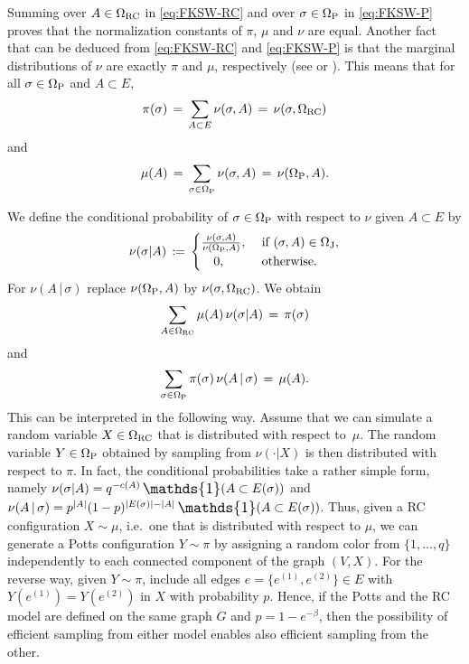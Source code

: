 \documentclass{dis}
\theoremstyle{citing}
\begin{document}
Summing over $A\in {\Omega}_{\rm RC}$ in \eqref{eq:FKSW-RC} and over 
$\sigma\in{\Omega}_{\rm P}$ in \eqref{eq:FKSW-P} 
proves that the normalization constants of $\pi$, $\mu$ and 
$\nu$ are equal.
Another fact that can be deduced from \eqref{eq:FKSW-RC} and 
\eqref{eq:FKSW-P} is that the marginal distributions of 
$\nu$ are exactly $\pi$ and $\mu$, respectively 
(see \cite{ES} or \cite{G1}).
This means that for all $\sigma\in{\Omega}_{\rm P}$ and 
$A\subset E$, 
\[
\pi(\sigma) \,=\, \sum_{A\subset E} \nu(\sigma,A) 
\,=\, \nu(\sigma,{\Omega}_{\rm RC})
\]
and 
\[
\mu(A) \,=\, \sum_{\sigma\in{\Omega}_{\rm P}} \nu(\sigma,A) 
\,=\, \nu({\Omega}_{\rm P},A).
\]

We define the conditional probability of $\sigma\in{\Omega}_{\rm P}$ 
with respect to $\nu$ given $A\subset E$ by
\begin{equation} \label{eq:joint-cond}
\nu(\sigma | A) \,:=\, \begin{cases}
\frac{\nu(\sigma,A)}{\nu({\Omega}_{\rm P},A)}, 
	&\text{ if } (\sigma,A)\in{\Omega}_{\rm J}, \\
\quad 0,& \text{ otherwise.}
\end{cases}
\end{equation}
For $\nu(A \,|\, \sigma)$ replace $\nu({{\Omega}_{\rm P}},A)$ by 
$\nu(\sigma,{{\Omega}_{\rm RC}})$. 
We obtain 
\[
\sum_{A\in{\Omega}_{\rm RC}} \mu(A)\, \nu(\sigma | A) 
\,=\, \pi(\sigma)
\]
and
\[
\sum_{\sigma\in{\Omega}_{\rm P}} \pi(\sigma)\, \nu(A \,|\, \sigma) 
\,=\, \mu(A).
\]
This can be interpreted in the following way.
Assume that we can simulate a random variable $X\in{\Omega}_{\rm RC}$ that is 
distributed with respect to~$\mu$. The random variable $Y\in{\Omega}_{\rm P}$ 
obtained by sampling from $\nu(\cdot |X)$ is then 
distributed with respect to $\pi$. 
In fact, the conditional probabilities take a rather simple form, 
namely $\nu(\sigma | A) = q^{-c(A)}\,{\scalebox{1.2}{\raisebox{-0.2mm}{$\mathds{1}$}}}(A\subset E(\sigma))$ and 
$\nu(A \,|\, \sigma) = p^{{\left\vert {A} \right\vert}} (1-p)^{{\left\vert {E(\sigma)} \right\vert}-{\left\vert {A} \right\vert}}\,
	{\scalebox{1.2}{\raisebox{-0.2mm}{$\mathds{1}$}}}(A\subset E(\sigma))$.
Thus, given a RC configuration $X\sim\mu$, i.e.~one that is distributed with 
respect to $\mu$, we can generate a Potts configuration 
$Y\sim\pi$ by assigning a random color from $\{1,\dots,q\}$ 
independently to each connected component of the graph $(V,X)$. 
For the reverse way, given $Y\sim\pi$, include all edges 
$e=\{e^{(1)},e^{(2)}\}\in E$ with $Y(e^{(1)})=Y(e^{(2)})$ in $X$ with 
probability $p$. 
Hence, if the Potts and the RC model are 
defined on the same graph $G$ and $p=1-e^{-\beta}$, 
then the possibility of efficient sampling from 
either model enables also efficient sampling from the other.
\end{document}
